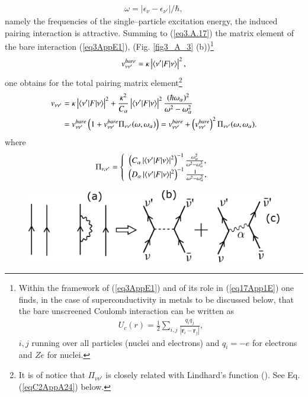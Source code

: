 \begin{subappendices}
\begin{align}
\omega=|\epsilon_\nu-\epsilon_{\nu'}|/\hbar,
\end{align}
namely the frequencies of the single--particle excitation energy, the induced pairing interaction is attractive.
Summing to (\ref{eq3.A.17}) the matrix element of the bare interaction (\ref{eq3AppE1}), (Fig. \ref{fig3_A_3} (b))\footnote{Within the framework of (\ref{eq3AppE1}) and of its role in (\ref{eq17App1E}) one finds, in the case of superconductivity in metals to be discussed below,  that the bare unscreened Coulomb interaction can be written as 
	\begin{align*}
	U_c(r)=\frac{1}{2}\sum_{i,j}\frac{q_iq_j}{|\mathbf r_i-\mathbf r_j|}, 
	\end{align*}
	$i,j$ running over all particles (nuclei and electrons) and $q_i=-e$ for electrons and $Ze$ for nuclei.}
\begin{align}
v_{\nu\nu'}^{bare}=\kappa\left|\langle {\nu'|F|\nu} \rangle\right|^2,
\end{align}
one obtains for the total pairing matrix element\footnote{It is of notice that $\Pi_{\nu\nu'}$ is closely related with Lindhard's function (\cite{Lindhard:53}). See Eq. (\ref{eqC2AppA24}) below.}
\begin{align}\label{eq17App1E}
\nonumber v_{\nu\nu'}&=\kappa\left|\langle {\nu'|F|\nu} \rangle\right|^2+\frac{\kappa^2}{C_\alpha}\left|\langle {\nu'|F|\nu} \rangle\right|^2\frac{(\hbar\omega_\alpha)^2}{\omega^2-\omega_\alpha^2}\\
&=v_{\nu\nu'}^{bare}\left(1+v_{\nu\nu'}^{bare}\Pi_{\nu\nu'}(\omega,\omega_\alpha)\right)=v^{bare}_{\nu\nu'}+\left(v^{bare}_{\nu\nu'}\right)^2\Pi_{\nu\nu'}(\omega,\omega_\alpha).
\end{align}
where
\begin{align}
\Pi_{\nu,\nu'}=\left\{\begin{array}{c}
 \left(C_\alpha\left|\langle {\nu'|F|\nu} \rangle\right|^2\right)^{-1}\frac{\omega_\alpha^2}{\omega^2-\omega_\alpha^2},\\ 
\left(D_\alpha\left|\langle {\nu'|F|\nu} \rangle\right|^2\right)^{-1}\frac{1}{\omega^2-\omega_\alpha^2},
\end{array}
\right. 
\end{align}
   \begin{figure}
   \centerline{\includegraphics*[width=12cm,angle=0	]{nutshell/figs/fig3_A_3}}

\end{figure}
\end{subappendices}
